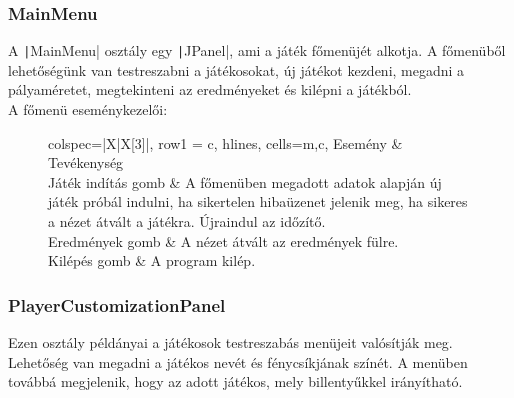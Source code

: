 \documentclass[a4paper,12pt]{article}
\begin{document}
	\subsubsection{MainMenu}
	A \texttt|MainMenu| osztály egy \texttt|JPanel|, ami a játék főmenüjét alkotja. A főmenüből lehetőségünk van testreszabni a játékosokat, új játékot kezdeni, megadni a pályaméretet, megtekinteni az eredményeket és kilépni a játékból.
	\\[4pt]
	A főmenü eseménykezelői:
	\begin{figure}[H]	
		\centering
		\begin{tblr}{colspec={|X|X[3]|}, row{1} = {c}, hlines, cells={m,c},}
			Esemény            & Tevékenység \\
			Játék indítás gomb & A főmenüben megadott adatok alapján új játék próbál indulni, ha sikertelen hibaüzenet jelenik meg, ha sikeres a nézet átvált a játékra. Újraindul az időzítő. \\
			Eredmények gomb    & A nézet átvált az eredmények fülre. \\
			Kilépés gomb       & A program kilép. \\
		\end{tblr}
	\end{figure}
	
	\subsubsection{PlayerCustomizationPanel}
	Ezen osztály példányai a játékosok testreszabás menüjeit valósítják meg. Lehetőség van megadni a játékos nevét és fénycsíkjának színét. A menüben továbbá megjelenik, hogy az adott játékos, mely billentyűkkel irányítható.
	\newpage
\end{document}
